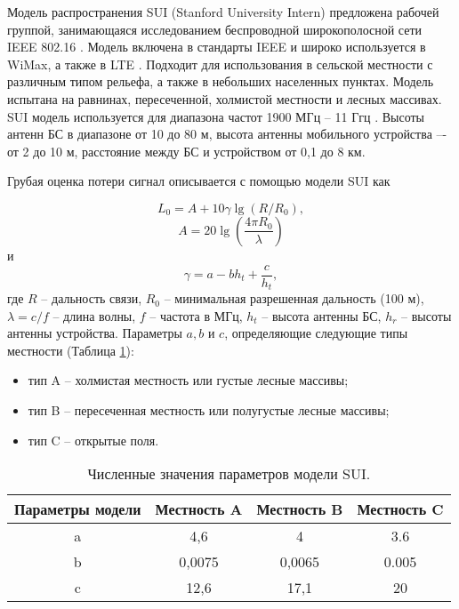 Модель распространения SUI (Stanford University Intern) предложена рабочей группой, занимающаяся исследованием беспроводной широкополосной сети IEEE 802.16 \cite{Mollel2014}. Модель включена в стандарты IEEE и широко используется в WiMax, а также в LTE \cite{Zreikat2017}. Подходит для использования в сельской местности с различным типом рельефа, а также в небольших населенных пунктах. Модель испытана на равнинах, пересеченной, холмистой местности и лесных массивах. SUI модель используется для диапазона частот 1900 МГц -- 11 Ггц \cite{Cabuk2020}. Высоты антенн БС в диапазоне от 10 до 80 м, высота антенны мобильного устройства –- от 2 до 10 м, расстояние между БС и устройством от 0,1 до 8 км.

Грубая оценка потери сигнал описывается с помощью модели SUI как

\begin{equation}
  \label{eq:part1_sui_l0}
  L_0 = A + 10\gamma\lg{(R/R_0)},
\end{equation}
$$
A = 20\lg{(\frac{4\pi R_0 }{\lambda})}
$$
и
$$
\gamma = a - b h_t + \frac{c}{h_t}, 
$$
где $R$ -- дальность связи, $R_0$ -- минимальная разрешенная дальность (100 м), $\lambda = c / f$ -- длина волны, $f$ -- частота в МГц, $h_t$ -- высота антенны БС, $h_r$ -- высоты антенны устройства. Параметры $a, b$ и $c$, определяющие следующие типы местности (Таблица \cref{tab:part1_abc_sui_model}):
\begin{itemize}
  \item тип A -- холмистая местность или густые лесные массивы;
  \item тип B -- пересеченная местность или полугустые лесные массивы;
  \item тип C -- открытые поля.
\end{itemize}


\begin{longtable}[c]{| c | c | c | c |}
  \caption{Численные значения параметров модели SUI.}\label{tab:part1_abc_sui_model}\\

  \hline
  \textbf{Параметры модели} & \textbf{Местность A} & \textbf{Местность B} &  \textbf{Местность C}\\ \hline
  a & 4,6 & 4 & 3.6 \\
  b & 0,0075 & 0,0065 & 0.005 \\
  c & 12,6 & 17,1 &20 \\
  \hline
  \hline
\end{longtable}




